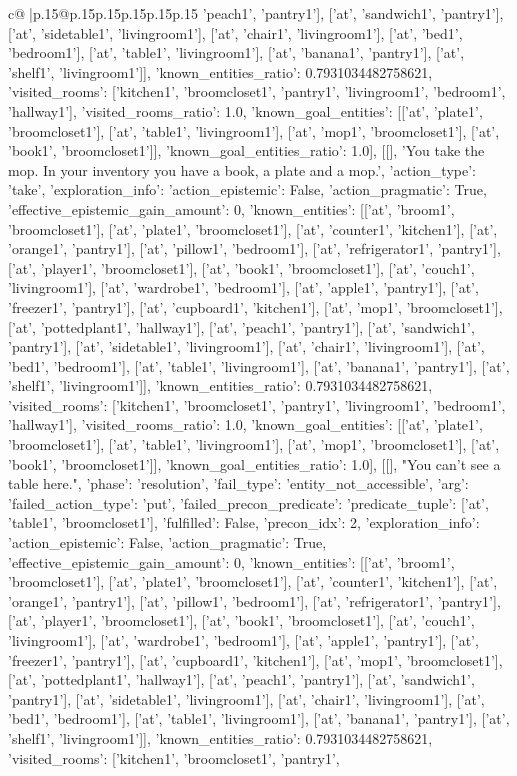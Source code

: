 \documentclass{article}
\begin{document}
{\begin{supertabular}{c@{$\;$}|p{.15\linewidth}@{}p{.15\linewidth}p{.15\linewidth}p{.15\linewidth}p{.15\linewidth}p{.15\linewidth}}
{{{'peach1', 'pantry1'], ['at', 'sandwich1', 'pantry1'], ['at', 'sidetable1', 'livingroom1'], ['at', 'chair1', 'livingroom1'], ['at', 'bed1', 'bedroom1'], ['at', 'table1', 'livingroom1'], ['at', 'banana1', 'pantry1'], ['at', 'shelf1', 'livingroom1']], 'known_entities_ratio': 0.7931034482758621, 'visited_rooms': ['kitchen1', 'broomcloset1', 'pantry1', 'livingroom1', 'bedroom1', 'hallway1'], 'visited_rooms_ratio': 1.0, 'known_goal_entities': [['at', 'plate1', 'broomcloset1'], ['at', 'table1', 'livingroom1'], ['at', 'mop1', 'broomcloset1'], ['at', 'book1', 'broomcloset1']], 'known_goal_entities_ratio': 1.0}}], [[], 'You take the mop. In your inventory you have a book, a plate and a mop.\n', {'action_type': 'take', 'exploration_info': {'action_epistemic': False, 'action_pragmatic': True, 'effective_epistemic_gain_amount': 0, 'known_entities': [['at', 'broom1', 'broomcloset1'], ['at', 'plate1', 'broomcloset1'], ['at', 'counter1', 'kitchen1'], ['at', 'orange1', 'pantry1'], ['at', 'pillow1', 'bedroom1'], ['at', 'refrigerator1', 'pantry1'], ['at', 'player1', 'broomcloset1'], ['at', 'book1', 'broomcloset1'], ['at', 'couch1', 'livingroom1'], ['at', 'wardrobe1', 'bedroom1'], ['at', 'apple1', 'pantry1'], ['at', 'freezer1', 'pantry1'], ['at', 'cupboard1', 'kitchen1'], ['at', 'mop1', 'broomcloset1'], ['at', 'pottedplant1', 'hallway1'], ['at', 'peach1', 'pantry1'], ['at', 'sandwich1', 'pantry1'], ['at', 'sidetable1', 'livingroom1'], ['at', 'chair1', 'livingroom1'], ['at', 'bed1', 'bedroom1'], ['at', 'table1', 'livingroom1'], ['at', 'banana1', 'pantry1'], ['at', 'shelf1', 'livingroom1']], 'known_entities_ratio': 0.7931034482758621, 'visited_rooms': ['kitchen1', 'broomcloset1', 'pantry1', 'livingroom1', 'bedroom1', 'hallway1'], 'visited_rooms_ratio': 1.0, 'known_goal_entities': [['at', 'plate1', 'broomcloset1'], ['at', 'table1', 'livingroom1'], ['at', 'mop1', 'broomcloset1'], ['at', 'book1', 'broomcloset1']], 'known_goal_entities_ratio': 1.0}}], [[], "You can't see a table here.\n", {'phase': 'resolution', 'fail_type': 'entity_not_accessible', 'arg': {'failed_action_type': 'put', 'failed_precon_predicate': {'predicate_tuple': ['at', 'table1', 'broomcloset1'], 'fulfilled': False, 'precon_idx': 2}}, 'exploration_info': {'action_epistemic': False, 'action_pragmatic': True, 'effective_epistemic_gain_amount': 0, 'known_entities': [['at', 'broom1', 'broomcloset1'], ['at', 'plate1', 'broomcloset1'], ['at', 'counter1', 'kitchen1'], ['at', 'orange1', 'pantry1'], ['at', 'pillow1', 'bedroom1'], ['at', 'refrigerator1', 'pantry1'], ['at', 'player1', 'broomcloset1'], ['at', 'book1', 'broomcloset1'], ['at', 'couch1', 'livingroom1'], ['at', 'wardrobe1', 'bedroom1'], ['at', 'apple1', 'pantry1'], ['at', 'freezer1', 'pantry1'], ['at', 'cupboard1', 'kitchen1'], ['at', 'mop1', 'broomcloset1'], ['at', 'pottedplant1', 'hallway1'], ['at', 'peach1', 'pantry1'], ['at', 'sandwich1', 'pantry1'], ['at', 'sidetable1', 'livingroom1'], ['at', 'chair1', 'livingroom1'], ['at', 'bed1', 'bedroom1'], ['at', 'table1', 'livingroom1'], ['at', 'banana1', 'pantry1'], ['at', 'shelf1', 'livingroom1']], 'known_entities_ratio': 0.7931034482758621, 'visited_rooms': ['kitchen1', 'broomcloset1', 'pantry1', }}}
\end{supertabular}}
\end{document}
